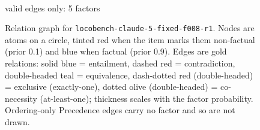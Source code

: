\documentclass[11pt]{article}
\begin{document}
\begin{figure}[htbp]
\begin{minipage}[t]{0.48\linewidth}
{
}
\\[2pt]{\footnotesize valid edges only: 5 factors}
\end{minipage}
\caption{Relation graph for \texttt{locobench-claude-5-fixed-f008-r1}. Nodes are atoms on a circle, tinted red when the item marks them non-factual (prior 0.1) and blue when factual (prior 0.9). Edges are gold relations: solid blue = entailment, dashed red = contradiction, double-headed teal = equivalence, dash-dotted red (double-headed) = exclusive (exactly-one), dotted olive (double-headed) = co-necessity (at-least-one); thickness scales with the factor probability. Ordering-only Precedence edges carry no factor and so are not drawn.}
\label{fig:graph-locobench-claude-5-fixed-f008-r1}
\end{figure}
\end{document}
